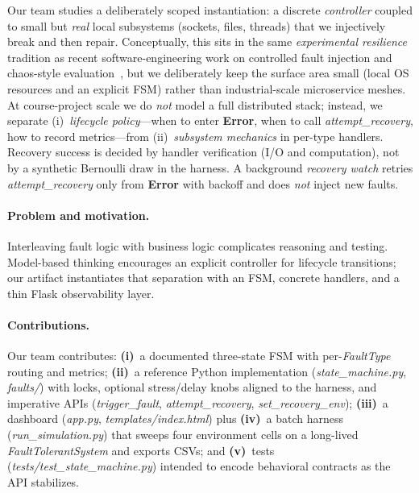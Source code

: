 \documentclass[sigconf,authorversion,nonacm]{acmart}
\begin{document}
Our team studies a deliberately scoped instantiation: a discrete \emph{controller} coupled to small but \emph{real} local subsystems (sockets, files, threads) that we injectively break and then repair. Conceptually, this sits in the same \emph{experimental resilience} tradition as recent software-engineering work on controlled fault injection and chaos-style evaluation~\cite{owotogbe2024chaos,he2024microfi}, but we deliberately keep the surface area small (local OS resources and an explicit FSM) rather than industrial-scale microservice meshes. At course-project scale we do \emph{not} model a full distributed stack; instead, we separate (i)~\emph{lifecycle policy}---when to enter \textbf{Error}, when to call \emph{attempt\_recovery}, how to record metrics---from (ii)~\emph{subsystem mechanics} in per-type handlers. Recovery success is decided by handler verification (I/O and computation), not by a synthetic Bernoulli draw in the harness. A background \emph{recovery watch} retries \emph{attempt\_recovery} only from \textbf{Error} with backoff and does \emph{not} inject new faults.

\paragraph{Problem and motivation.}
Interleaving fault logic with business logic complicates reasoning and testing. Model-based thinking encourages an explicit controller for lifecycle transitions; our artifact instantiates that separation with an FSM, concrete handlers, and a thin Flask observability layer.

\paragraph{Contributions.}
Our team contributes: \textbf{(i)}~a documented three-state FSM with per-\emph{FaultType} routing and metrics; \textbf{(ii)}~a reference Python implementation (\emph{state\_machine.py}, \emph{faults/}) with locks, optional stress/delay knobs aligned to the harness, and imperative APIs (\emph{trigger\_fault}, \emph{attempt\_recovery}, \emph{set\_recovery\_env}); \textbf{(iii)}~a dashboard (\emph{app.py}, \emph{templates/index.html}) plus \textbf{(iv)}~a batch harness (\emph{run\_simulation.py}) that sweeps four environment cells on a long-lived \emph{FaultTolerantSystem} and exports CSVs; and \textbf{(v)}~tests (\emph{tests/test\_state\_machine.py}) intended to encode behavioral contracts as the API stabilizes.
\end{document}
